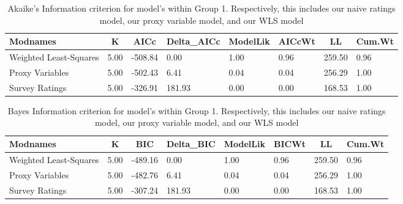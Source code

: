 \documentclass[
  man,floatsintext]{apa6}
\begin{document}
\begin{table}[H]

\begin{center}
\begin{threeparttable}

\caption{\label{tab:aic-bic}Akaike's Information criterion for model's within Group 1. Respectively, this includes our naive ratings model, our proxy variable model, and our WLS model}

\begin{tabular}{llllllll}
\toprule
Modnames & \multicolumn{1}{c}{K} & \multicolumn{1}{c}{AICc} & \multicolumn{1}{c}{Delta\_AICc} & \multicolumn{1}{c}{ModelLik} & \multicolumn{1}{c}{AICcWt} & \multicolumn{1}{c}{LL} & \multicolumn{1}{c}{Cum.Wt}\\
\midrule
Weighted Least-Squares & 5.00 & -508.84 & 0.00 & 1.00 & 0.96 & 259.50 & 0.96\\
Proxy Variables & 5.00 & -502.43 & 6.41 & 0.04 & 0.04 & 256.29 & 1.00\\
Survey Ratings & 5.00 & -326.91 & 181.93 & 0.00 & 0.00 & 168.53 & 1.00\\
\bottomrule
\end{tabular}

\end{threeparttable}
\end{center}

\end{table}

\begin{table}[H]

\begin{center}
\begin{threeparttable}

\caption{\label{tab:aic-bic}Bayes Information criterion for model's within Group 1. Respectively, this includes our naive ratings model, our proxy variable model, and our WLS model}

\begin{tabular}{llllllll}
\toprule
Modnames & \multicolumn{1}{c}{K} & \multicolumn{1}{c}{BIC} & \multicolumn{1}{c}{Delta\_BIC} & \multicolumn{1}{c}{ModelLik} & \multicolumn{1}{c}{BICWt} & \multicolumn{1}{c}{LL} & \multicolumn{1}{c}{Cum.Wt}\\
\midrule
Weighted Least-Squares & 5.00 & -489.16 & 0.00 & 1.00 & 0.96 & 259.50 & 0.96\\
Proxy Variables & 5.00 & -482.76 & 6.41 & 0.04 & 0.04 & 256.29 & 1.00\\
Survey Ratings & 5.00 & -307.24 & 181.93 & 0.00 & 0.00 & 168.53 & 1.00\\
\bottomrule
\end{tabular}

\end{threeparttable}
\end{center}

\end{table}
\end{document}
